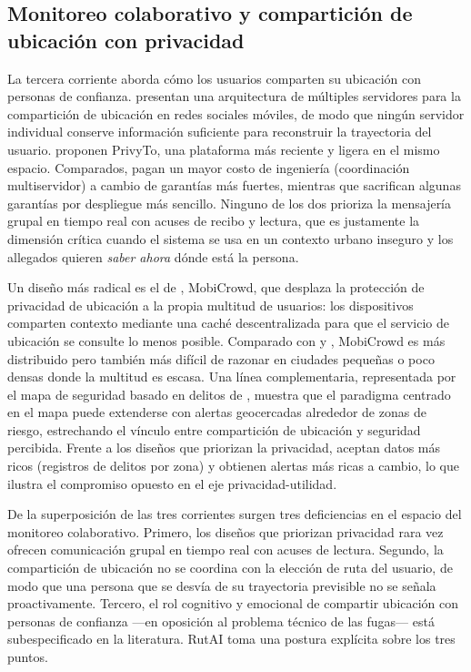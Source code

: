 \documentclass[a4paper,fleqn]{cas-sc}
\newcommand{\RUTAI}{RutAI\xspace}
\begin{document}
	\subsection{Monitoreo colaborativo y compartici\'on de ubicaci\'on con privacidad}\label{sec:rw-collab}
	
	La tercera corriente aborda c\'omo los usuarios comparten su ubicaci\'on con personas de confianza. \citet{li2017locsharing} presentan una arquitectura de m\'ultiples servidores para la compartici\'on de ubicaci\'on en redes sociales m\'oviles, de modo que ning\'un servidor individual conserve informaci\'on suficiente para reconstruir la trayectoria del usuario. \citet{mckenzie2022privyto} proponen PrivyTo, una plataforma m\'as reciente y ligera en el mismo espacio. Comparados, \citet{li2017locsharing} pagan un mayor costo de ingenier\'ia (coordinaci\'on multiservidor) a cambio de garant\'ias m\'as fuertes, mientras que \citet{mckenzie2022privyto} sacrifican algunas garant\'ias por despliegue m\'as sencillo. Ninguno de los dos prioriza la mensajer\'ia grupal en tiempo real con acuses de recibo y lectura, que es justamente la dimensi\'on cr\'itica cuando el sistema se usa en un contexto urbano inseguro y los allegados quieren \emph{saber ahora} d\'onde est\'a la persona.
	
	Un dise\~no m\'as radical es el de \citet{shokri2014mobicrowd}, MobiCrowd, que desplaza la protecci\'on de privacidad de ubicaci\'on a la propia multitud de usuarios: los dispositivos comparten contexto mediante una cach\'e descentralizada para que el servicio de ubicaci\'on se consulte lo menos posible. Comparado con \citet{li2017locsharing} y \citet{mckenzie2022privyto}, MobiCrowd es m\'as distribuido pero tambi\'en m\'as dif\'icil de razonar en ciudades peque\~nas o poco densas donde la multitud es escasa. Una l\'inea complementaria, representada por el mapa de seguridad basado en delitos de \citet{kim2025crimesafetymap}, muestra que el paradigma centrado en el mapa puede extenderse con alertas geocercadas alrededor de zonas de riesgo, estrechando el v\'inculo entre compartici\'on de ubicaci\'on y seguridad percibida. Frente a los dise\~nos que priorizan la privacidad, \citet{kim2025crimesafetymap} aceptan datos m\'as ricos (registros de delitos por zona) y obtienen alertas m\'as ricas a cambio, lo que ilustra el compromiso opuesto en el eje privacidad-utilidad.
	
	De la superposici\'on de las tres corrientes surgen tres deficiencias en el espacio del monitoreo colaborativo. Primero, los dise\~nos que priorizan privacidad rara vez ofrecen comunicaci\'on grupal en tiempo real con acuses de lectura. Segundo, la compartici\'on de ubicaci\'on no se coordina con la elecci\'on de ruta del usuario, de modo que una persona que se desv\'ia de su trayectoria previsible no se se\~nala proactivamente. Tercero, el rol cognitivo y emocional de compartir ubicaci\'on con personas de confianza ---en oposici\'on al problema t\'ecnico de las fugas--- est\'a subespecificado en la literatura. \RUTAI toma una postura expl\'icita sobre los tres puntos.
	
\end{document}

